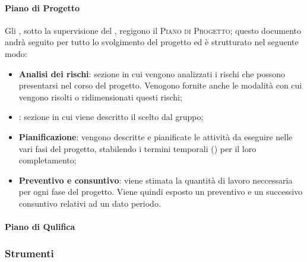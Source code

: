 \documentclass[../norme-di-progetto.tex]{subfiles}
\begin{document}
\paragraph{Piano di Progetto}
Gli \emph{}, sotto la supervisione del , regigono il \textsc{Piano di Progetto}; questo documento andrà seguito per tutto lo svolgimento del progetto ed è strutturato nel seguente modo:
\begin{itemize}
    \item \textbf{Analisi dei rischi}: sezione in cui vengono analizzati i rischi che possono presentarsi nel corso del progetto. Venogono fornite anche le modalità con cui vengono risolti o ridimensionati questi rischi;
    \item {}: sezione in cui viene descritto il  scelto dal gruppo;
    \item \textbf{Pianificazione}: vengono descritte e pianificate le attività da eseguire nelle vari fasi del progetto, stabilendo i termini temporali () per il loro completamento;
    \item \textbf{Preventivo e consuntivo}: viene stimata la quantità di lavoro neccessaria per ogni fase del progetto. Viene quindi esposto un preventivo e un successivo consuntivo relativi ad un dato periodo.
\end{itemize}

\paragraph{Piano di Qulifica}


\subsubsection{Strumenti}
\end{document}
